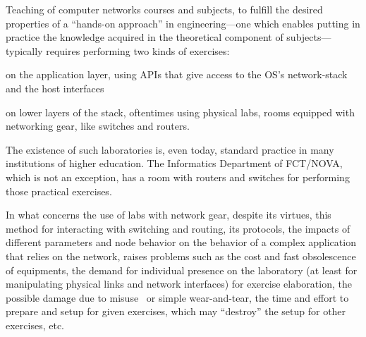 Teaching of computer networks courses and subjects, to fulfill the desired properties of a ``hands-on approach'' in engineering---one which enables putting in practice the knowledge acquired in the theoretical component of subjects--- typically requires performing two kinds of exercises: %
  \begin{enumerate*}[label=(\roman*), itemjoin={{, }}, itemjoin*={{, and }}]
  \item on the application layer, using APIs that give access to the OS's network-stack and the host interfaces
  \item on lower layers of the stack, oftentimes using physical labs, rooms equipped with networking gear, like switches and routers.
  \end{enumerate*}
The existence of such laboratories is, even today, standard practice in many institutions of higher education.
The Informatics Department of FCT/NOVA, which is not an exception, has a room with routers and switches for performing those practical exercises.

In what concerns the use of labs with network gear, despite its virtues, this method for interacting with switching and routing, its protocols, the impacts of different parameters and node behavior on the behavior of a complex application that relies on the network, raises problems such as the cost and fast obsolescence~\cite{automaticnetconfiggns} of equipments, the demand for individual presence on the laboratory (at least for manipulating physical links and network interfaces) for exercise elaboration, the possible damage due to misuse~\cite{teachinginovation} or simple wear-and-tear, the time and effort to prepare and setup for given exercises, which may ``destroy'' the setup for other exercises, etc. %

